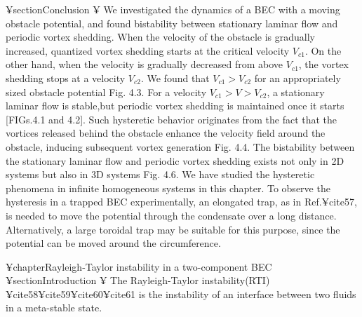 {{{{{¥section{Conclusion}
¥ We investigated the dynamics of a BEC with a moving
obstacle potential, and found bistability between stationary
laminar flow and periodic vortex shedding. When the velocity
of the obstacle is gradually increased, quantized vortex
shedding starts at the critical velocity $V_{c1}$. On the other hand,
when the velocity is gradually decreased from above $V_{c1}$,
the vortex shedding stops at a velocity $V_{c2}$. We found that
$V_{c1} > V_{c2}$ for an appropriately sized obstacle potential Fig. 4.3.
For a velocity $V_{c1} > V > V_{c2}$, a stationary laminar flow is
stable,but periodic vortex shedding is maintained once it starts
[FIGs.4.1 and 4.2]. Such hysteretic behavior originates from the
fact that the vortices released behind the obstacle enhance the
velocity field around the obstacle, inducing subsequent vortex
generation Fig. 4.4. The bistability between the stationary
laminar flow and periodic vortex shedding exists not only in
2D systems but also in 3D systems Fig. 4.6.
We have studied the hysteretic phenomena in infinite
homogeneous systems in this chapter. To observe the hysteresis
in a trapped BEC experimentally, an elongated trap, as
in Ref.¥cite{57}, is needed to move the potential through the
condensate over a long distance.
Alternatively, a large toroidal trap may be suitable for
this purpose, since the potential can be moved around the 
circumference.

¥chapter{Rayleigh-Taylor instability in a two-component BEC}
¥section{Introduction}
¥ The Rayleigh-Taylor instability(RTI) ¥cite{58}¥cite{59}¥cite{60}¥cite{61} is the instability of an interface between
two fluids in a meta-stable state.

}}}}}
